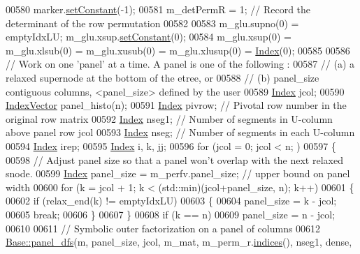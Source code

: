 \begin{DoxyCode}
00580   marker.\hyperlink{class_eigen_1_1_plain_object_base_ac8dea1df3d92b752cc683ff42abf6f9b}{setConstant}(-1);
00581   m\_detPermR = 1; \textcolor{comment}{// Record the determinant of the row permutation}
00582   
00583   m\_glu.supno(0) = emptyIdxLU; m\_glu.xsup.\hyperlink{class_eigen_1_1_plain_object_base_ac8dea1df3d92b752cc683ff42abf6f9b}{setConstant}(0);
00584   m\_glu.xsup(0) = m\_glu.xlsub(0) = m\_glu.xusub(0) = m\_glu.xlusup(0) = \hyperlink{namespace_eigen_a62e77e0933482dafde8fe197d9a2cfde}{Index}(0);
00585   
00586   \textcolor{comment}{// Work on one 'panel' at a time. A panel is one of the following :}
00587   \textcolor{comment}{//  (a) a relaxed supernode at the bottom of the etree, or}
00588   \textcolor{comment}{//  (b) panel\_size contiguous columns, <panel\_size> defined by the user}
00589   \hyperlink{namespace_eigen_a62e77e0933482dafde8fe197d9a2cfde}{Index} jcol; 
00590   \hyperlink{group___core___module}{IndexVector} panel\_histo(n);
00591   \hyperlink{namespace_eigen_a62e77e0933482dafde8fe197d9a2cfde}{Index} pivrow; \textcolor{comment}{// Pivotal row number in the original row matrix}
00592   \hyperlink{namespace_eigen_a62e77e0933482dafde8fe197d9a2cfde}{Index} nseg1; \textcolor{comment}{// Number of segments in U-column above panel row jcol}
00593   \hyperlink{namespace_eigen_a62e77e0933482dafde8fe197d9a2cfde}{Index} nseg; \textcolor{comment}{// Number of segments in each U-column }
00594   \hyperlink{namespace_eigen_a62e77e0933482dafde8fe197d9a2cfde}{Index} irep; 
00595   \hyperlink{namespace_eigen_a62e77e0933482dafde8fe197d9a2cfde}{Index} i, k, jj; 
00596   \textcolor{keywordflow}{for} (jcol = 0; jcol < n; )
00597   \{
00598     \textcolor{comment}{// Adjust panel size so that a panel won't overlap with the next relaxed snode. }
00599     \hyperlink{namespace_eigen_a62e77e0933482dafde8fe197d9a2cfde}{Index} panel\_size = m\_perfv.panel\_size; \textcolor{comment}{// upper bound on panel width}
00600     \textcolor{keywordflow}{for} (k = jcol + 1; k < (std::min)(jcol+panel\_size, n); k++)
00601     \{
00602       \textcolor{keywordflow}{if} (relax\_end(k) != emptyIdxLU) 
00603       \{
00604         panel\_size = k - jcol; 
00605         \textcolor{keywordflow}{break}; 
00606       \}
00607     \}
00608     \textcolor{keywordflow}{if} (k == n) 
00609       panel\_size = n - jcol; 
00610       
00611     \textcolor{comment}{// Symbolic outer factorization on a panel of columns }
00612     \hyperlink{group___sparse_l_u___module_acaf62fda387ea03e9caa2734e4e7b0c9}{Base::panel\_dfs}(m, panel\_size, jcol, m\_mat, m\_perm\_r.\hyperlink{group___core___module_a2f1ab379207fcd1ceb33941e25cf50c2}{indices}(), nseg1, dense, 

\end{DoxyCode}

